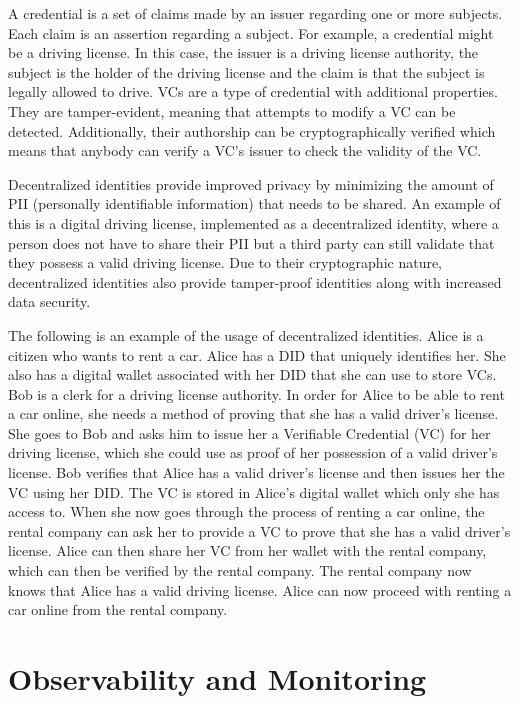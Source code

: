 A credential is a set of claims made by an issuer regarding one or more subjects.
Each claim is an assertion regarding a subject.
For example, a credential might be a driving license. In this case, the issuer is a driving license authority,
the subject is the holder of the driving license and the claim is that the subject is legally allowed to drive.
VCs are a type of credential with additional properties.
They are tamper-evident, meaning that attempts to modify a VC can be detected.
Additionally, their authorship can be cryptographically verified which means that anybody can verify a VC's issuer
to check the validity of the VC.

Decentralized identities provide improved privacy by minimizing the amount of PII (personally identifiable information)
that needs to be shared. An example of this is a digital driving license, implemented as a decentralized identity,
where a person does not have to share their PII but a third party can still validate
that they possess a valid driving license. Due to their cryptographic nature,
decentralized identities also provide tamper-proof identities along with increased data security.

The following is an example of the usage of decentralized identities.
Alice is a citizen who wants to rent a car. Alice has a DID that uniquely identifies her.
She also has a digital wallet associated with her DID that she can use
to store VCs. Bob is a clerk for a driving license authority.
In order for Alice to be able to rent a car online, she needs a method of proving that she has a valid
driver's license. She goes to Bob and asks him to issue her a Verifiable Credential (VC) for her driving
license, which she could use as proof of her possession of a valid driver's license.
Bob verifies that Alice has a valid driver's license and then issues her the VC using her DID.
The VC is stored in Alice's digital wallet which only she has access to.
When she now goes through the process of renting a car online, the rental company
can ask her to provide a VC to prove that she has a valid driver's license.
Alice can then share her VC from her wallet with the rental company, which can then be
verified by the rental company. The rental company now knows that Alice has a valid driving license.
Alice can now proceed with renting a car online from the rental company.

\section{Observability and Monitoring}
\label{sec:foundation_observability}

